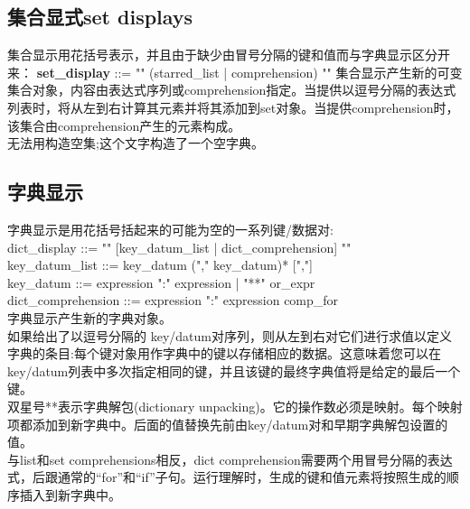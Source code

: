 \documentclass[10pt,UTF8]{ctexart}
\begin{document}
\subsection{集合显式set displays}
集合显示用花括号表示，并且由于缺少由冒号分隔的键和值而与字典显示区分开来：
\textbf{set_display} ::= "{" (starred_list | comprehension) "}"
集合显示产生新的可变集合对象，内容由表达式序列或comprehension指定。当提供以逗号分隔的表达式列表时，将从左到右计算其元素并将其添加到set对象。当提供comprehension时，该集合由comprehension产生的元素构成。\\
\indent 无法用{}构造空集;这个文字构造了一个空字典。
\subsection{字典显示}
字典显示是用花括号括起来的可能为空的一系列键/数据对:\\
dict_display ::= "{" [key_datum_list | dict_comprehension] "}"\\
key_datum_list ::=  key_datum ("," key_datum)* [","]\\
key_datum ::=  expression ":" expression | "**" or_expr\\
dict_comprehension ::=  expression ":" expression comp_for\\
\indent 字典显示产生新的字典对象。\\
\indent 如果给出了以逗号分隔的 key/datum对序列，则从左到右对它们进行求值以定义字典的条目:每个键对象用作字典中的键以存储相应的数据。这意味着您可以在 key/datum列表中多次指定相同的键，并且该键的最终字典值将是给定的最后一个键。\\
\indent 双星号**表示字典解包(dictionary unpacking)。它的操作数必须是映射。每个映射项都添加到新字典中。后面的值替换先前由key/datum对和早期字典解包设置的值。\\
\indent 与list和set comprehensions相反，dict comprehension需要两个用冒号分隔的表达式，后跟通常的“for”和“if”子句。运行理解时，生成的键和值元素将按照生成的顺序插入到新字典中。
\end{document}
